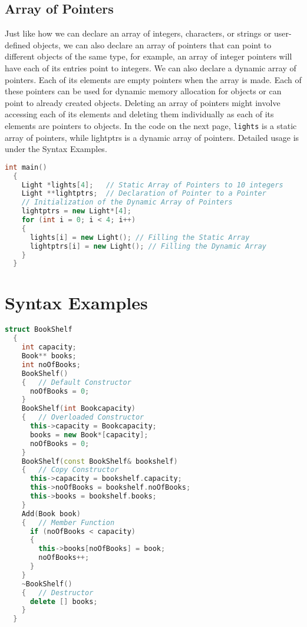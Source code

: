\documentclass[11pt,fleqn]{book} %
\begin{document}
\subsection{Array of Pointers}

Just like how we can declare an array of integers, characters, or strings or user-defined objects, we can also declare an array of pointers that can point to different objects of the same type, for example, an array of integer pointers will have each of its entries point to integers. We can also declare a dynamic array of pointers. Each of its elements are empty pointers when the array is made. Each of these pointers can be used for dynamic memory allocation for objects or can point to already created objects. Deleting an array of pointers might involve accessing each of its elements and deleting them individually as each of its elements are pointers to objects. In the code on the next page, \texttt{lights} is a static array of pointers, while lightptrs is a dynamic array of pointers. Detailed usage is under the Syntax Examples.
\vfill

\begin{lstlisting}[language=C++, caption=Declaration of Arrays of Pointers]
  int main()
  {
    Light *lights[4];   // Static Array of Pointers to 10 integers
    Light **lightptrs;  // Declaration of Pointer to a Pointer
    // Initialization of the Dynamic Array of Pointers
    lightptrs = new Light*[4];
    for (int i = 0; i < 4; i++)
    {
      lights[i] = new Light(); // Filling the Static Array
      lightptrs[i] = new Light(); // Filling the Dynamic Array
    }
  }
\end{lstlisting}


\section{Syntax Examples}


\begin{lstlisting}[language=C++, caption={Default, Overloaded and Copy Constructors}]
  struct BookShelf
  {
    int capacity;
    Book** books;
    int noOfBooks;
    BookShelf()
    {   // Default Constructor
      noOfBooks = 0;
    }
    BookShelf(int Bookcapacity)
    {   // Overloaded Constructor
      this->capacity = Bookcapacity;
      books = new Book*[capacity];
      noOfBooks = 0;
    }
    BookShelf(const BookShelf& bookshelf) 
    {   // Copy Constructor
      this->capacity = bookshelf.capacity;
      this->noOfBooks = bookshelf.noOfBooks;
      this->books = bookshelf.books;
    }
    Add(Book book)
    {   // Member Function
      if (noOfBooks < capacity)
      {
        this->books[noOfBooks] = book;
        noOfBooks++;
      }
    }
    ~BookShelf()                            
    {   // Destructor
      delete [] books;
    }
  }
\end{lstlisting}
\end{document}

